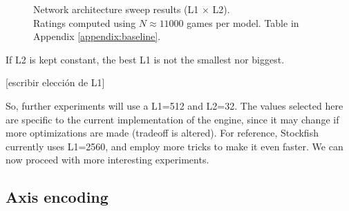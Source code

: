 \begin{figure}[h]
\centering
{}
\captionsetup{justification=centering}
\caption{Network architecture sweep results (L1 $\times$ L2).\\ Ratings computed using $N\approx11000$ games per model. Table in Appendix \ref{appendix:baseline}.}
\label{fig:baseline_heatmaps}
\end{figure}


If L2 is kept constant, the best L1 is not the smallest nor biggest.

[escribir elección de L1]

So, further experiments will use a L1=512 and L2=32. The values selected here are specific to the current implementation of the engine, since it may change if more optimizations are made (tradeoff is altered). For reference, Stockfish currently uses L1=2560, and employ more tricks to make it even faster. We can now proceed with more interesting experiments.

\newpage
\subsection{Axis encoding} %
\label{sec:axis_encoding}

\newcommand{\axisarrows}[1]{\parbox{0.7cm}{\texttt{[image: ../assets/arrows/\#1.pdf]}}}
\newcommand{\axisarrowsSM}[1]{\parbox{0.6cm}{\texttt{[image: ../assets/arrows/\#1.pdf]}}}


